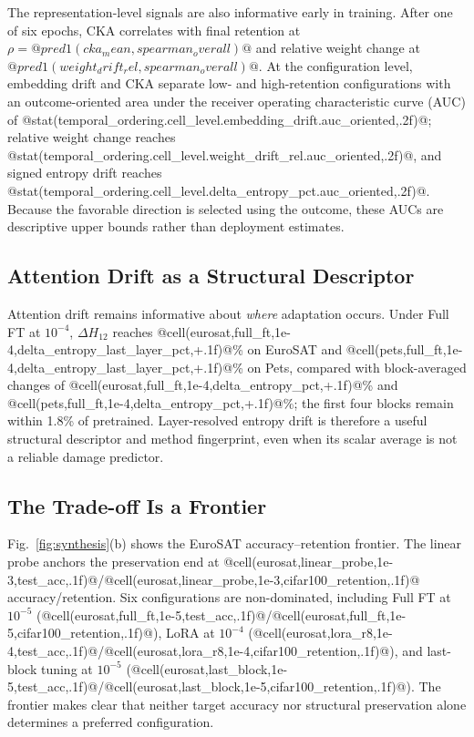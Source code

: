 \documentclass[conference]{IEEEtran}
\begin{document}
The representation-level signals are also informative early in training. After one of six epochs, CKA correlates with final retention at $\rho=@pred1(cka_mean,spearman_overall)@$ and relative weight change at $@pred1(weight_drift_rel,spearman_overall)@$. At the configuration level, embedding drift and CKA separate low- and high-retention configurations with an outcome-oriented area under the receiver operating characteristic curve (AUC) of @stat(temporal_ordering.cell_level.embedding_drift.auc_oriented,.2f)@; relative weight change reaches @stat(temporal_ordering.cell_level.weight_drift_rel.auc_oriented,.2f)@, and signed entropy drift reaches @stat(temporal_ordering.cell_level.delta_entropy_pct.auc_oriented,.2f)@. Because the favorable direction is selected using the outcome, these AUCs are descriptive upper bounds rather than deployment estimates.

\subsection{Attention Drift as a Structural Descriptor}
Attention drift remains informative about \emph{where} adaptation occurs. Under Full FT at $10^{-4}$, $\Delta H_{12}$ reaches @cell(eurosat,full_ft,1e-4,delta_entropy_last_layer_pct,+.1f)@\% on EuroSAT and @cell(pets,full_ft,1e-4,delta_entropy_last_layer_pct,+.1f)@\% on Pets, compared with block-averaged changes of @cell(eurosat,full_ft,1e-4,delta_entropy_pct,+.1f)@\% and @cell(pets,full_ft,1e-4,delta_entropy_pct,+.1f)@\%; the first four blocks remain within 1.8\% of pretrained. Layer-resolved entropy drift is therefore a useful structural descriptor and method fingerprint, even when its scalar average is not a reliable damage predictor.

\subsection{The Trade-off Is a Frontier}
Fig.~\ref{fig:synthesis}(b) shows the EuroSAT accuracy--retention frontier. The linear probe anchors the preservation end at @cell(eurosat,linear_probe,1e-3,test_acc,.1f)@/@cell(eurosat,linear_probe,1e-3,cifar100_retention,.1f)@ accuracy/retention. Six configurations are non-dominated, including Full FT at $10^{-5}$ (@cell(eurosat,full_ft,1e-5,test_acc,.1f)@/@cell(eurosat,full_ft,1e-5,cifar100_retention,.1f)@), LoRA at $10^{-4}$ (@cell(eurosat,lora_r8,1e-4,test_acc,.1f)@/@cell(eurosat,lora_r8,1e-4,cifar100_retention,.1f)@), and last-block tuning at $10^{-5}$ (@cell(eurosat,last_block,1e-5,test_acc,.1f)@/@cell(eurosat,last_block,1e-5,cifar100_retention,.1f)@). The frontier makes clear that neither target accuracy nor structural preservation alone determines a preferred configuration.
\end{document}
